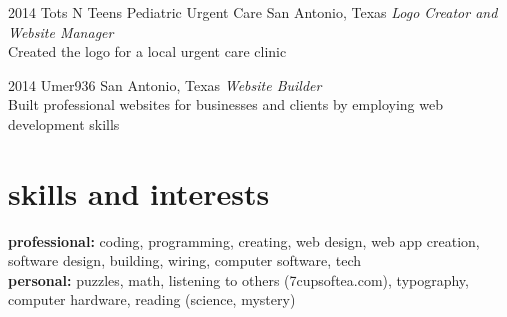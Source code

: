 \documentclass[]{friggeri-cv} %
\begin{document}
\begin{entrylist}

	\entry
	{2014}
	{Tots N Teens Pediatric Urgent Care}
	{San Antonio, Texas}
	{\emph{Logo Creator and Website Manager} \\
	Created the logo for a local urgent care clinic}


	\entry
	{2014}
	{Umer936}
	{San Antonio, Texas}
	{\emph{Website Builder} \\
	Built professional websites for businesses and clients by employing web development skills}

\end{entrylist}


\section{skills and interests}

\textbf{professional:} coding, programming, creating, web design, web app creation, software design, building, wiring, computer software, tech
\\
\textbf{personal:} puzzles, math, listening to others (7cupsoftea.com), typography, computer hardware, reading (science, mystery)

\pagebreak



\end{document}
